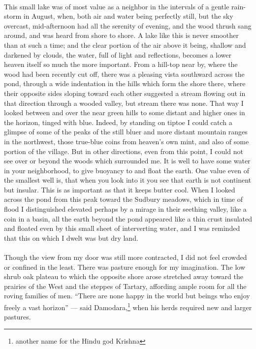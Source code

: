 \documentclass[letterpaper,12pt]{article}
\begin{document}
\paragraph{} This small lake was of most value as a neighbor in the intervals of
a gentle rain-storm in August, when, both air and water being perfectly still,
but the sky overcast, mid-afternoon had all the serenity of evening, and the
wood thrush sang around, and was heard from shore to shore. A lake like this is
never smoother than at such a time; and the clear portion of the air above it
being, shallow and darkened by clouds, the water, full of light and reflections,
becomes a lower heaven itself so much the more important. From a hill-top near
by, where the wood had been recently cut off, there was a pleasing vista
southward across the pond, through a wide indentation in the hills which form
the shore there, where their opposite sides sloping toward each other suggested
a stream flowing out in that direction through a wooded valley, but stream there
was none. That way I looked between and over the near green hills to some
distant and higher ones in the horizon, tinged with blue. Indeed, by standing on
tiptoe I could catch a glimpse of some of the peaks of the still bluer and more
distant mountain ranges in the northwest, those true-blue coins from heaven's
own mint, and also of some portion of the village. But in other directions, even
from this point, I could not see over or beyond the woods which surrounded me.
It is well to have some water in your neighborhood, to give buoyancy to and
float the earth. One value even of the smallest well is, that when you look into
it you see that earth is not continent but insular. This is as important as that
it keeps butter cool. When I looked across the pond from this peak toward the
Sudbury meadows, which in time of flood I distinguished elevated perhaps by
a mirage in their seething valley, like a coin in a basin, all the earth beyond
the pond appeared like a thin crust insulated and floated even by this small
sheet of interverting water, and I was reminded that this on which I dwelt was
but dry land.

\paragraph{} Though the view from my door was still more contracted, I did not
feel crowded or confined in the least. There was pasture enough for my
imagination. The low shrub oak plateau to which the opposite shore arose
stretched away toward the prairies of the West and the steppes of Tartary,
affording ample room for all the roving families of men. \enquote{There are none
    happy in the world but beings who enjoy freely a vast horizon} --- said
Damodara,\footnote{another name for the Hindu god Krishna} when his herds
required new and larger pastures.
\end{document}
